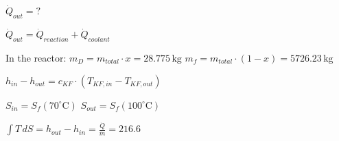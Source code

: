 \( \dot{Q}_{out} = ? \)  

\( \dot{Q}_{out} = \dot{Q}_{reaction} + \dot{Q}_{coolant} \)  

In the reactor:  
\( m_D = m_{total} \cdot x = 28.775 \, \text{kg} \)  
\( m_f = m_{total} \cdot (1 - x) = 5726.23 \, \text{kg} \)  

\( h_{in} - h_{out} = c_{KF} \cdot (T_{KF,in} - T_{KF,out}) \)  

\( S_{in} = S_f (70^\circ \text{C}) \)  
\( S_{out} = S_f (100^\circ \text{C}) \)  

\( \int T \, dS = h_{out} - h_{in} = \frac{\dot{Q}}{\dot{m}} = 216.6 \)